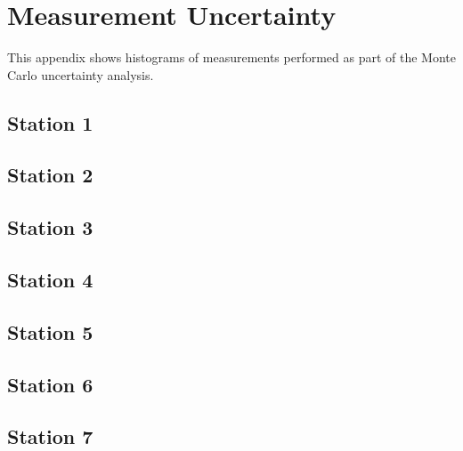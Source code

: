 
\chapter{Measurement Uncertainty}
\label{appendix:uncertainty_histograms}

This appendix shows histograms of measurements performed as part of the Monte 
Carlo uncertainty analysis.
\newpage
\section{Station 1}



\section{Station 2}



\section{Station 3}



\section{Station 4}



\section{Station 5}



\section{Station 6}



\section{Station 7}



